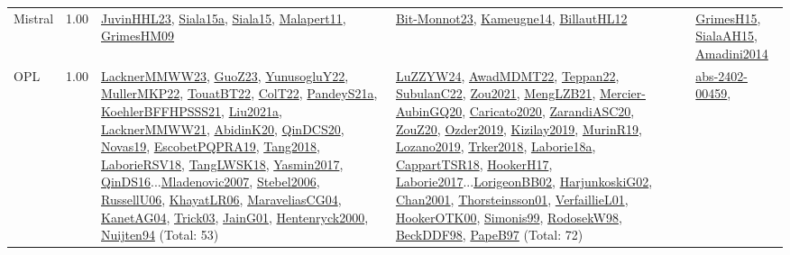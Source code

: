 {\begin{longtable}{p{3cm}r>{\raggedright\arraybackslash}p{6cm}>{\raggedright\arraybackslash}p{6cm}>{\raggedright\arraybackslash}p{8cm}}
\index{Mistral}\index{CPSystems!Mistral}Mistral &  1.00 & \hyperref[detail:JuvinHHL23]{JuvinHHL23}, \hyperref[detail:Siala15a]{Siala15a}, \hyperref[detail:Siala15]{Siala15}, \hyperref[detail:Malapert11]{Malapert11}, \hyperref[detail:GrimesHM09]{GrimesHM09} & \hyperref[detail:Bit-Monnot23]{Bit-Monnot23}, \hyperref[detail:Kameugne14]{Kameugne14}, \hyperref[detail:BillautHL12]{BillautHL12} & \hyperref[detail:GrimesH15]{GrimesH15}, \hyperref[detail:SialaAH15]{SialaAH15}, \hyperref[detail:Amadini2014]{Amadini2014}\\
\index{OPL}\index{CPSystems!OPL}OPL &  1.00 & \hyperref[detail:LacknerMMWW23]{LacknerMMWW23}, \hyperref[detail:GuoZ23]{GuoZ23}, \hyperref[detail:YunusogluY22]{YunusogluY22}, \hyperref[detail:MullerMKP22]{MullerMKP22}, \hyperref[detail:TouatBT22]{TouatBT22}, \hyperref[detail:ColT22]{ColT22}, \hyperref[detail:PandeyS21a]{PandeyS21a}, \hyperref[detail:KoehlerBFFHPSSS21]{KoehlerBFFHPSSS21}, \hyperref[detail:Liu2021a]{Liu2021a}, \hyperref[detail:LacknerMMWW21]{LacknerMMWW21}, \hyperref[detail:AbidinK20]{AbidinK20}, \hyperref[detail:QinDCS20]{QinDCS20}, \hyperref[detail:Novas19]{Novas19}, \hyperref[detail:EscobetPQPRA19]{EscobetPQPRA19}, \hyperref[detail:Tang2018]{Tang2018}, \hyperref[detail:LaborieRSV18]{LaborieRSV18}, \hyperref[detail:TangLWSK18]{TangLWSK18}, \hyperref[detail:Yasmin2017]{Yasmin2017}, \hyperref[detail:QinDS16]{QinDS16}...\hyperref[detail:Mladenovic2007]{Mladenovic2007}, \hyperref[detail:Stebel2006]{Stebel2006}, \hyperref[detail:RussellU06]{RussellU06}, \hyperref[detail:KhayatLR06]{KhayatLR06}, \hyperref[detail:MaraveliasCG04]{MaraveliasCG04}, \hyperref[detail:KanetAG04]{KanetAG04}, \hyperref[detail:Trick03]{Trick03}, \hyperref[detail:JainG01]{JainG01}, \hyperref[detail:Hentenryck2000]{Hentenryck2000}, \hyperref[detail:Nuijten94]{Nuijten94} (Total: 53) & \hyperref[detail:LuZZYW24]{LuZZYW24}, \hyperref[detail:AwadMDMT22]{AwadMDMT22}, \hyperref[detail:Teppan22]{Teppan22}, \hyperref[detail:SubulanC22]{SubulanC22}, \hyperref[detail:Zou2021]{Zou2021}, \hyperref[detail:MengLZB21]{MengLZB21}, \hyperref[detail:Mercier-AubinGQ20]{Mercier-AubinGQ20}, \hyperref[detail:Caricato2020]{Caricato2020}, \hyperref[detail:ZarandiASC20]{ZarandiASC20}, \hyperref[detail:ZouZ20]{ZouZ20}, \hyperref[detail:Ozder2019]{Ozder2019}, \hyperref[detail:Kizilay2019]{Kizilay2019}, \hyperref[detail:MurinR19]{MurinR19}, \hyperref[detail:Lozano2019]{Lozano2019}, \hyperref[detail:Trker2018]{Trker2018}, \hyperref[detail:Laborie18a]{Laborie18a}, \hyperref[detail:CappartTSR18]{CappartTSR18}, \hyperref[detail:HookerH17]{HookerH17}, \hyperref[detail:Laborie2017]{Laborie2017}...\hyperref[detail:LorigeonBB02]{LorigeonBB02}, \hyperref[detail:HarjunkoskiG02]{HarjunkoskiG02}, \hyperref[detail:Chan2001]{Chan2001}, \hyperref[detail:Thorsteinsson01]{Thorsteinsson01}, \hyperref[detail:VerfaillieL01]{VerfaillieL01}, \hyperref[detail:HookerOTK00]{HookerOTK00}, \hyperref[detail:Simonis99]{Simonis99}, \hyperref[detail:RodosekW98]{RodosekW98}, \hyperref[detail:BeckDDF98]{BeckDDF98}, \hyperref[detail:PapeB97]{PapeB97} (Total: 72) & \hyperref[detail:abs-2402-00459]{abs-2402-00459}, 
\end{longtable}}
